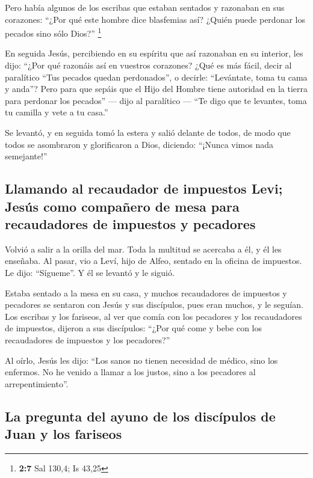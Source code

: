  Pero había algunos de los escribas que estaban sentados y
razonaban en sus corazones:  ``¿Por qué este hombre dice
blasfemias así? ¿Quién puede perdonar los pecados sino sólo Dios?''
\footnote{\textbf{2:7} Sal 130,4; Is 43,25}

 En seguida Jesús, percibiendo en su espíritu que así
razonaban en su interior, les dijo: ``¿Por qué razonáis así en vuestros
corazones?  ¿Qué es más fácil, decir al paralítico ``Tus
pecados quedan perdonados'', o decirle: ``Levántate, toma tu cama y
anda''?  Pero para que sepáis que el Hijo del Hombre
tiene autoridad en la tierra para perdonar los pecados'' --- dijo al
paralítico ---  ``Te digo que te levantes, toma tu
camilla y vete a tu casa.''

 Se levantó, y en seguida tomó la estera y salió delante
de todos, de modo que todos se asombraron y glorificaron a Dios,
diciendo: ``¡Nunca vimos nada semejante!''

\hypertarget{llamando-al-recaudador-de-impuestos-levi-jesuxfas-como-compauxf1ero-de-mesa-para-recaudadores-de-impuestos-y-pecadores}{%
\subsection{Llamando al recaudador de impuestos Levi; Jesús como
compañero de mesa para recaudadores de impuestos y
pecadores}\label{llamando-al-recaudador-de-impuestos-levi-jesuxfas-como-compauxf1ero-de-mesa-para-recaudadores-de-impuestos-y-pecadores}}

 Volvió a salir a la orilla del mar. Toda la multitud se
acercaba a él, y él les enseñaba.  Al pasar, vio a Leví,
hijo de Alfeo, sentado en la oficina de impuestos. Le dijo: ``Sígueme''.
Y él se levantó y le siguió.

 Estaba sentado a la mesa en su casa, y muchos
recaudadores de impuestos y pecadores se sentaron con Jesús y sus
discípulos, pues eran muchos, y le seguían.  Los escribas
y los fariseos, al ver que comía con los pecadores y los recaudadores de
impuestos, dijeron a sus discípulos: ``¿Por qué come y bebe con los
recaudadores de impuestos y los pecadores?''

 Al oírlo, Jesús les dijo: ``Los sanos no tienen
necesidad de médico, sino los enfermos. No he venido a llamar a los
justos, sino a los pecadores al arrepentimiento''.

\hypertarget{la-pregunta-del-ayuno-de-los-discuxedpulos-de-juan-y-los-fariseos}{%
\subsection{La pregunta del ayuno de los discípulos de Juan y los
fariseos}\label{la-pregunta-del-ayuno-de-los-discuxedpulos-de-juan-y-los-fariseos}}

